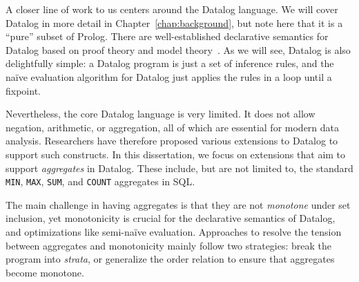 A closer line of work to us centers around the Datalog language.
We will cover Datalog in more detail in Chapter~\ref{chap:background}, 
 but note here that it is a ``pure'' subset of Prolog.
There are well-established declarative semantics for Datalog based on proof theory 
 and model theory~\cite{DBLP:books/aw/AbiteboulHV95}.
As we will see, Datalog is also delightfully simple: 
 a Datalog program is just a set of inference rules, 
 and the na\"ive evaluation algorithm for Datalog just applies the rules in a loop until a fixpoint.
 
Nevertheless, the core Datalog language is very limited. 
It does not allow negation, arithmetic, or aggregation, 
 all of which are essential for modern data analysis.
Researchers have therefore proposed various extensions to Datalog
 to support such constructs.
In this dissertation, we focus on extensions
 that aim to support {\em aggregates} in Datalog.  These include, but
 are not limited to, the standard \texttt{MIN}, \texttt{MAX},
 \texttt{SUM}, and \texttt{COUNT} aggregates in SQL.
 
 The main challenge in having aggregates is that they are not {\em
   monotone} under set inclusion, yet monotonicity is crucial for the
 declarative semantics of Datalog, and optimizations like semi-na\"ive
 evaluation.  
 Approaches to resolve the tension between aggregates and monotonicity
 mainly follow two strategies: break the program into {\em strata}, or
 generalize the order relation to ensure that aggregates become
 monotone.
 
